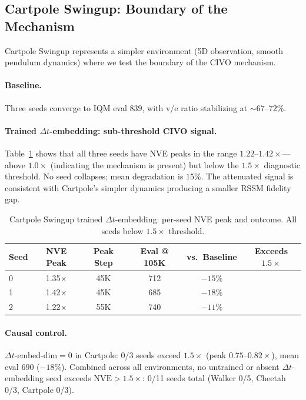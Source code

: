 \documentclass[10pt,letterpaper]{article}
\newcommand{\dt}{\Delta t}
\newcommand{\nve}{\mathrm{NVE}}
\begin{document}
\subsection{Cartpole Swingup: Boundary of the Mechanism}
\label{sec:cartpole}

Cartpole Swingup represents a simpler environment (5D observation, smooth pendulum dynamics) where we test the boundary of the CIVO mechanism.

\paragraph{Baseline.}
Three seeds converge to IQM eval $839$, with v/e ratio stabilizing at ${\sim}67$--$72\%$.

\paragraph{Trained $\dt$-embedding: sub-threshold CIVO signal.}
Table~\ref{tab:cartpole_trained} shows that all three seeds have NVE peaks in the range $1.22$--$1.42\times$---above $1.0\times$ (indicating the mechanism is present) but below the $1.5\times$ diagnostic threshold.
No seed collapses; mean degradation is $15\%$.
The attenuated signal is consistent with Cartpole's simpler dynamics producing a smaller RSSM fidelity gap.

\begin{table}[h]
\centering
\caption{Cartpole Swingup trained $\dt$-embedding: per-seed NVE peak and outcome. All seeds below $1.5\times$ threshold.}
\label{tab:cartpole_trained}
\small
\begin{tabular}{lccccc}
\toprule
Seed & NVE Peak & Peak Step & Eval @ 105K & vs.\ Baseline & Exceeds $1.5\times$ \\
\midrule
0 & 1.35$\times$ & 45K & 712 & $-15\%$ &  \\
1 & 1.42$\times$ & 45K & 685 & $-18\%$ &  \\
2 & 1.22$\times$ & 55K & 740 & $-11\%$ &  \\
\bottomrule
\end{tabular}
\end{table}

\paragraph{Causal control.}
$\dt$-embed-dim$=$0 in Cartpole: 0/3 seeds exceed $1.5\times$ (peak $0.75$--$0.82\times$), mean eval $690$ ($-18\%$).
Combined across all environments, no untrained or absent $\dt$-embedding seed exceeds $\nve > 1.5\times$: 0/11 seeds total (Walker 0/5, Cheetah 0/3, Cartpole 0/3).
\end{document}
